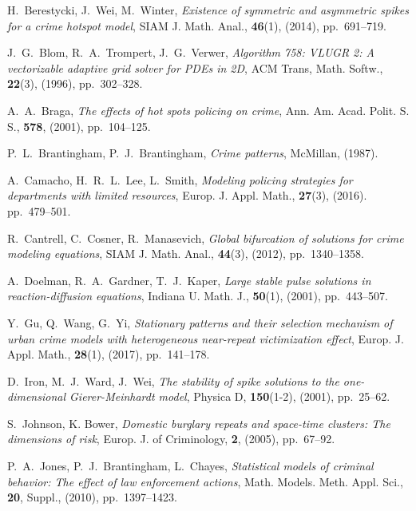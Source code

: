 \documentclass{article}%
\begin{document}
\begin{thebibliography}{99}


 H.~Berestycki, J.~Wei, M.~Winter, \textit{Existence
of symmetric and asymmetric spikes for a crime hotspot model}, SIAM
J. Math. Anal., \textbf{46}(1), (2014), pp.~691--719.

 J.~G.~Blom, R.~A.~Trompert, J.~G.~Verwer,
\textit{Algorithm 758: VLUGR 2: A vectorizable adaptive grid solver for
PDEs in 2D}, ACM Trans, Math. Softw., \textbf{22}(3), (1996), pp.~302--328.

 A.~A.~Braga, \textit{The effects of hot spots policing
  on crime}, Ann. Am. Acad. Polit. S. S., \textbf{578}, (2001),
  pp.~104--125.

 P.~L.~Brantingham, P.~J.~Brantingham, \textit{Crime
patterns}, McMillan, (1987).

 A.~Camacho, H.~R.~L.~Lee, L.~Smith, \textit{Modeling policing
strategies for departments with limited resources}, Europ. J. Appl. Math.,
\textbf{27}(3), (2016). pp.~479--501.

 R.~Cantrell, C.~Cosner, R.~Manasevich, \textit{Global
  bifurcation of solutions for crime modeling equations}, SIAM
  J. Math. Anal., \textbf{44}(3), (2012), pp.~1340--1358.

 A.~Doelman, R.~A.~Gardner, T.~J.~Kaper, \textit{Large
  stable pulse solutions in reaction-diffusion equations}, Indiana
  U. Math. J., \textbf{50}(1), (2001), pp.~443--507.

 Y.~Gu, Q.~Wang, G.~Yi, \textit{Stationary
patterns and their selection mechanism of urban crime models with
heterogeneous near-repeat victimization effect}, Europ. J. Appl.
Math., \textbf{28}(1), (2017), pp.~141--178.

 D.~Iron, M.~J.~Ward, J.~Wei, \textit{The
stability of spike solutions to the one-dimensional Gierer-Meinhardt
model}, Physica D, \textbf{150}(1-2), (2001), pp.~25--62.

 S.~Johnson, K. Bower, \textit{Domestic burglary
repeats and space-time clusters: The dimensions of risk}, Europ. J.
of Criminology, \textbf{2}, (2005), pp.~67--92.

 P.~A.~Jones, P.~J.~Brantingham, L.~Chayes,
  \textit{Statistical models of criminal behavior: The effect of law
    enforcement actions}, Math. Models. Meth. Appl. Sci., \textbf{20},
  Suppl., (2010), pp.~1397--1423.


\end{thebibliography}
\end{document}
